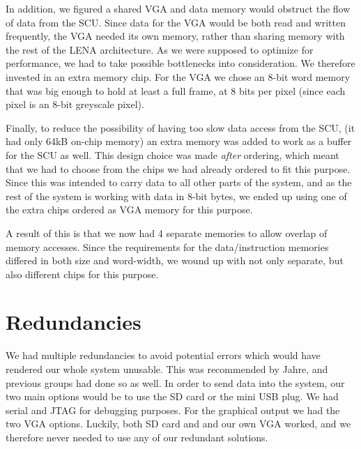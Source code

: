 In addition, we figured a shared \ac{VGA} and data memory would obstruct the
flow of data from the \ac{SCU}. Since data for the \ac{VGA} would be both read
and written frequently, the \ac{VGA} needed its own memory, rather than sharing
memory with the rest of the LENA architecture. As we were supposed to optimize
for performance, we had to take possible bottlenecks into consideration. We
therefore invested in an extra memory chip. For the VGA we chose an 8-bit word
memory that was big enough to hold at least a full frame, at 8 bits per
pixel (since each pixel is an 8-bit greyscale pixel).

Finally, to reduce the possibility of having too slow data access from the SCU,
(it had only 64kB on-chip memory) an extra memory was added to work as a buffer
for the SCU as well. This design choice was made {\em after} ordering, which
meant that we had to choose from the chips we had already ordered to fit this
purpose. Since this was intended to carry data to all other parts of the system,
and as the rest of the system is working with data in 8-bit bytes, we ended up
using one of the extra chips ordered as \ac{VGA} memory for this purpose.

A result of this is that we now had 4 separate memories to allow overlap of
memory accesses. Since the requirements for the data/instruction memories
differed in both size and word-width, we wound up with not only separate, but
also different chips for this purpose.

\section{Redundancies}
We had multiple redundancies to avoid potential errors which would have rendered
our whole system unusable. This was recommended by Jahre, and previous groups
had done so as well. In order to send data into the system, our two main options
would be to use the \ac{SD} card or the mini \ac{USB} plug. We had serial and
\ac{JTAG} for debugging purposes. For the graphical output we had the two
\ac{VGA} options. Luckily, both \ac{SD} card and and our own \ac{VGA} worked,
and we therefore never needed to use any of our redundant solutions.

